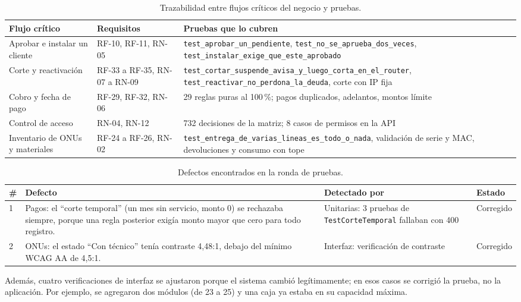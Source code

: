 \begin{table}[H]
\centering
\caption{Trazabilidad entre flujos críticos del negocio y pruebas.}
\label{tab:ce02-e4-flujos}
\small
\begin{tabularx}{\textwidth}{L{3.6cm}L{2.6cm}X}
\toprule
\textbf{Flujo crítico} & \textbf{Requisitos} & \textbf{Pruebas que lo cubren} \\
\midrule
Aprobar e instalar un cliente & RF-10, RF-11, RN-05 & \texttt{test\_aprobar\_un\_pendiente}, \texttt{test\_no\_se\_aprueba\_dos\_veces}, \texttt{test\_instalar\_exige\_que\_este\_aprobado} \\
Corte y reactivación & RF-33 a RF-35, RN-07 a RN-09 & \texttt{test\_cortar\_suspende\_avisa\_y\_luego\_corta\_en\_el\_router}, \texttt{test\_reactivar\_no\_perdona\_la\_deuda}, corte con IP fija \\
Cobro y fecha de pago & RF-29, RF-32, RN-06 & 29 reglas puras al 100\,\%; pagos duplicados, adelantos, montos límite \\
Control de acceso & RN-04, RN-12 & 732 decisiones de la matriz; 8 casos de permisos en la API \\
Inventario de ONUs y materiales & RF-24 a RF-26, RN-02 & \texttt{test\_entrega\_de\_varias\_lineas\_es\_todo\_o\_nada}, validación de serie y MAC, devoluciones y consumo con tope \\
\bottomrule
\end{tabularx}
\end{table}

\begin{table}[H]
\centering
\caption{Defectos encontrados en la ronda de pruebas.}
\label{tab:ce02-e4-defectos}
\small
\begin{tabularx}{\textwidth}{C{0.6cm}XL{3.4cm}L{1.6cm}}
\toprule
\textbf{\#} & \textbf{Defecto} & \textbf{Detectado por} & \textbf{Estado} \\
 & Pagos: el ``corte temporal'' (un mes sin servicio, monto 0) se rechazaba siempre, porque una regla posterior exigía monto mayor que cero para todo registro. & Unitarias: 3 pruebas de \texttt{TestCorteTemporal} fallaban con 400 & Corregido \\
2 & ONUs: el estado ``Con técnico'' tenía contraste 4,48:1, debajo del mínimo WCAG AA de 4,5:1. & Interfaz: verificación de contraste & Corregido \\
\bottomrule
\end{tabularx}
\end{table}

\noindent Además, cuatro verificaciones de interfaz se ajustaron porque el sistema cambió
legítimamente; en esos casos se corrigió la prueba, no la aplicación. Por ejemplo, se agregaron
dos módulos (de 23 a 25) y una caja ya estaba en su capacidad máxima.

